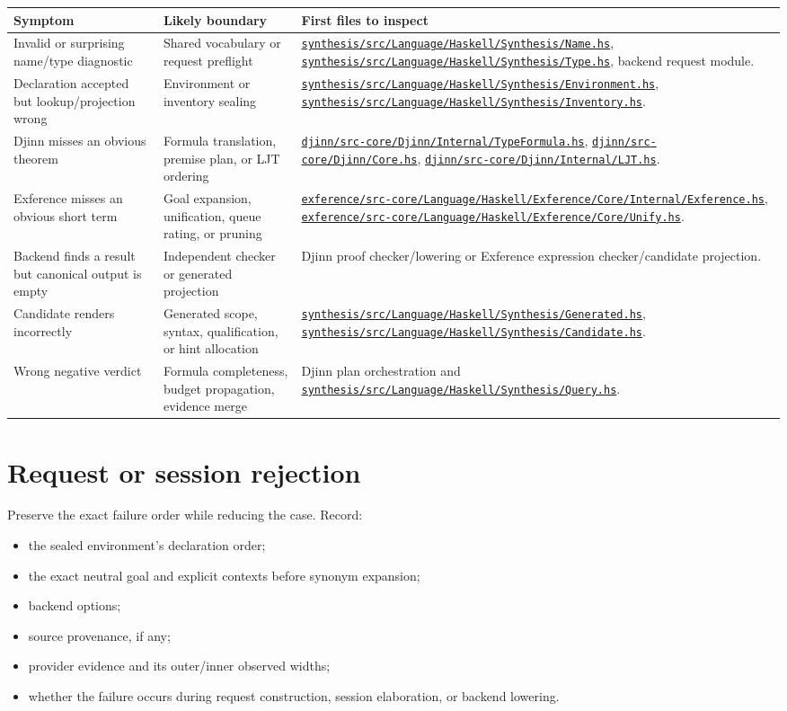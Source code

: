 \documentclass[10pt,letterpaper,oneside]{report}
\def\DjexBase{https://github.com/VladimirReshetnikov/Djex/blob/d3d9662598460316bdcd177ce6768c521e764aa8/}
\newcommand{\dpath}[1]{\href{\DjexBase#1}{\nolinkurl{#1}}}
\begin{document}
\begin{longtable}{@{}L{0.28\textwidth}L{0.31\textwidth}L{0.33\textwidth}@{}}
\toprule
\textbf{Symptom} & \textbf{Likely boundary} & \textbf{First files to inspect} \\
\midrule
\endhead
Invalid or surprising name/type diagnostic & Shared vocabulary or request preflight & \dpath{synthesis/src/Language/Haskell/Synthesis/Name.hs}, \dpath{synthesis/src/Language/Haskell/Synthesis/Type.hs}, backend request module. \\
Declaration accepted but lookup/projection wrong & Environment or inventory sealing & \dpath{synthesis/src/Language/Haskell/Synthesis/Environment.hs}, \dpath{synthesis/src/Language/Haskell/Synthesis/Inventory.hs}. \\
Djinn misses an obvious theorem & Formula translation, premise plan, or LJT ordering & \dpath{djinn/src-core/Djinn/Internal/TypeFormula.hs}, \dpath{djinn/src-core/Djinn/Core.hs}, \dpath{djinn/src-core/Djinn/Internal/LJT.hs}. \\
Exference misses an obvious short term & Goal expansion, unification, queue rating, or pruning & \dpath{exference/src-core/Language/Haskell/Exference/Core/Internal/Exference.hs}, \dpath{exference/src-core/Language/Haskell/Exference/Core/Unify.hs}. \\
Backend finds a result but canonical output is empty & Independent checker or generated projection & Djinn proof checker/lowering or Exference expression checker/candidate projection. \\
Candidate renders incorrectly & Generated scope, syntax, qualification, or hint allocation & \dpath{synthesis/src/Language/Haskell/Synthesis/Generated.hs}, \dpath{synthesis/src/Language/Haskell/Synthesis/Candidate.hs}. \\
Wrong negative verdict & Formula completeness, budget propagation, evidence merge & Djinn plan orchestration and \dpath{synthesis/src/Language/Haskell/Synthesis/Query.hs}. \\
\bottomrule
\end{longtable}

\section{Request or session rejection}

Preserve the exact failure order while reducing the case. Record:

\begin{itemize}
  \item the sealed environment's declaration order;
  \item the exact neutral goal and explicit contexts before synonym expansion;
  \item backend options;
  \item source provenance, if any;
  \item provider evidence and its outer/inner observed widths;
  \item whether the failure occurs during request construction, session elaboration, or backend lowering.
\end{itemize}
\end{document}
